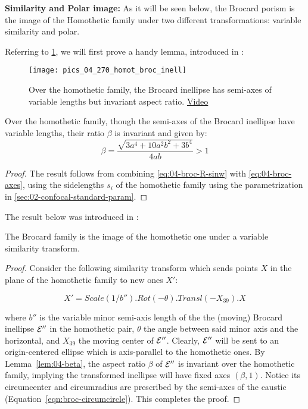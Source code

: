\noindent \textbf{Similarity and Polar image:} As it will be seen below, the Brocard porism is the image of the Homothetic family under two different transformations: variable similarity and polar.

Referring to \cref{fig:04-homot-broc-inell}, we will first prove a handy lemma, introduced in  \cite{reznik2020-similarityII}:

\begin{figure}
    \centering
    \texttt{[image: pics\_04\_270\_homot\_broc\_inell]}
    \caption{Over the homothetic family, the Brocard inellipse has semi-axes of variable lengths but invariant aspect ratio. \href{https://youtu.be/DIm2qTxGWXE}{Video}}
    \label{fig:04-homot-broc-inell}
\end{figure}

\begin{lemma}
Over the homothetic family, though the semi-axes of the Brocard inellipse have variable lengths, their ratio $\beta$ is invariant and given by:
\[\beta=
\frac{\sqrt{3a^4+10a^2b^2+3b^4}}{4ab} > 1\]
\label{lem:04-beta}
\end{lemma}

\begin{proof}
The result follows from combining \cref{eq:04-broc-R-sinw} with \cref{eq:04-broc-axes}, using the sidelengths $s_i$ of the homothetic family using the parametrization in \cref{sec:02-confocal-standard-param}.
\end{proof}

The result below was introduced in \cite[Thm 4.1]{reznik2020-similarityII}:

\begin{proposition}
The Brocard family is the image of the homothetic one under a variable similarity transform.
\end{proposition}

\begin{proof}
Consider the following similarity transform which sends points $X$ in the plane of the homothetic family to new ones $X'$:

\[X'=Scale(1/b'').Rot(-\theta).Transl(-X_{39}).X\]

\noindent where  $b''$ is the variable minor semi-axis length of the the (moving) Brocard inellipse $\mathcal{E}''$ in the homothetic pair, $\theta$ the angle between said minor axis and the horizontal, and $X_{39}$ the moving center of $\mathcal{E}''$. Clearly, $\mathcal{E}''$ will be sent to an origin-centered ellipse which is axis-parallel to the homothetic ones. By Lemma~\ref{lem:04-beta}, the aspect ratio $\beta$ of $\mathcal{E}''$ is invariant over the homothetic family, implying the transformed inellipse will have fixed axes $(\beta, 1)$. Notice its circumcenter and circumradius are prescribed by the semi-axes of the caustic (Equation~\ref{eqn:broc-circumcircle}). This completes the proof. 
\end{proof}

